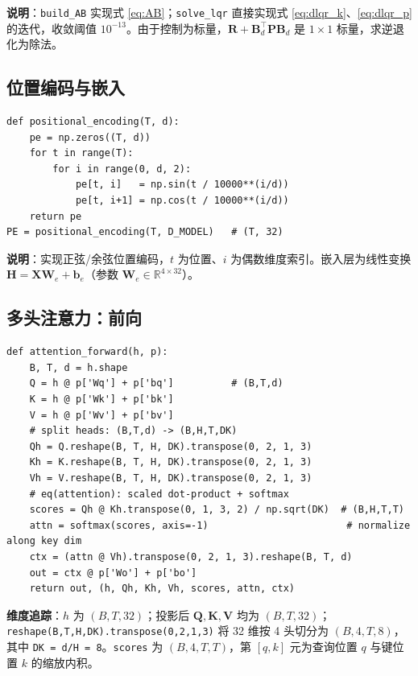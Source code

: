 \documentclass[11pt,a4paper]{article}
\begin{document}
\textbf{说明}：\texttt{build\_AB} 实现式 \eqref{eq:AB}；\texttt{solve\_lqr} 直接实现式 \eqref{eq:dlqr_k}、\eqref{eq:dlqr_p} 的迭代，收敛阈值 $10^{-13}$。由于控制为标量，$\mathbf R + \mathbf B_d^{\top}\mathbf P\mathbf B_d$ 是 $1\times 1$ 标量，求逆退化为除法。

\subsection{位置编码与嵌入}

\begin{lstlisting}
def positional_encoding(T, d):
    pe = np.zeros((T, d))
    for t in range(T):
        for i in range(0, d, 2):
            pe[t, i]   = np.sin(t / 10000**(i/d))
            pe[t, i+1] = np.cos(t / 10000**(i/d))
    return pe
PE = positional_encoding(T, D_MODEL)   # (T, 32)
\end{lstlisting}

\textbf{说明}：实现正弦/余弦位置编码，$t$ 为位置、$i$ 为偶数维度索引。嵌入层为线性变换 $\mathbf H = \mathbf X\mathbf W_e + \mathbf b_e$（参数 $\mathbf W_e\in\mathbb{R}^{4\times 32}$）。

\subsection{多头注意力：前向}

\begin{lstlisting}
def attention_forward(h, p):
    B, T, d = h.shape
    Q = h @ p['Wq'] + p['bq']          # (B,T,d)
    K = h @ p['Wk'] + p['bk']
    V = h @ p['Wv'] + p['bv']
    # split heads: (B,T,d) -> (B,H,T,DK)
    Qh = Q.reshape(B, T, H, DK).transpose(0, 2, 1, 3)
    Kh = K.reshape(B, T, H, DK).transpose(0, 2, 1, 3)
    Vh = V.reshape(B, T, H, DK).transpose(0, 2, 1, 3)
    # eq(attention): scaled dot-product + softmax
    scores = Qh @ Kh.transpose(0, 1, 3, 2) / np.sqrt(DK)  # (B,H,T,T)
    attn = softmax(scores, axis=-1)                        # normalize along key dim
    ctx = (attn @ Vh).transpose(0, 2, 1, 3).reshape(B, T, d)
    out = ctx @ p['Wo'] + p['bo']
    return out, (h, Qh, Kh, Vh, scores, attn, ctx)
\end{lstlisting}

\textbf{维度追踪}：$h$ 为 $(B,T,32)$；投影后 $\mathbf Q,\mathbf K,\mathbf V$ 均为 $(B,T,32)$；\texttt{reshape(B,T,H,DK).transpose(0,2,1,3)} 将 32 维按 4 头切分为 $(B,4,T,8)$，其中 \texttt{DK = d/H = 8}。\texttt{scores} 为 $(B,4,T,T)$，第 $[q,k]$ 元为查询位置 $q$ 与键位置 $k$ 的缩放内积。
\end{document}
